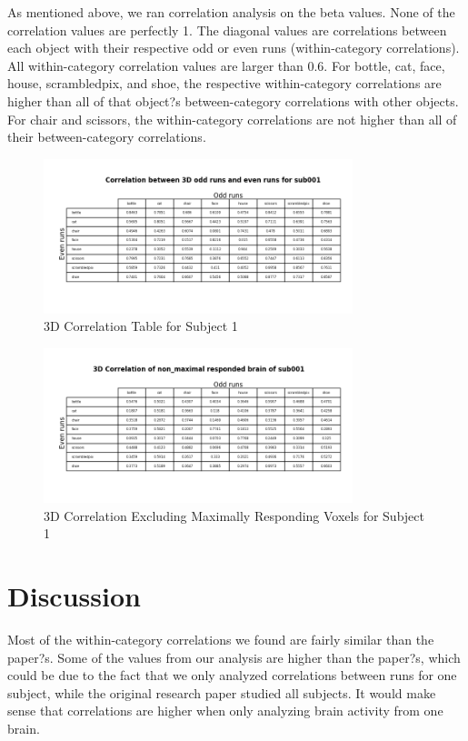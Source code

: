 \documentclass[11pt,twocolumn]{article}
\begin{document}
As mentioned above, we ran correlation analysis on the beta values.
None of the correlation values are perfectly 1. The diagonal values 
are correlations between each object with their respective odd or 
even runs (within-category correlations). All within-category correlation 
values are larger than 0.6. For bottle, cat, face, house, scrambledpix, 
and shoe, the respective within-category correlations are higher than 
all of that object?s between-category correlations with other objects. 
For chair and scissors, the within-category correlations are not higher 
than all of their between-category correlations.
\begin{figure}[h!]
\centering
\includegraphics[width=90mm]{3d_correlation_table_sub001.png}
\caption{3D Correlation Table for Subject 1}
\end{figure}

\begin{figure}[h!]                                                              
\centering                                                                      
\includegraphics[width=90mm]{3d_non_max_correlation_table_sub001.png}                   
\caption{3D Correlation Excluding Maximally Responding Voxels for Subject 1}                                    
\end{figure}

\section{Discussion}

Most of the within-category correlations we found are fairly similar than the paper?s. 
Some of the values from our analysis are higher than the paper?s, which could be 
due to the fact that we only analyzed correlations between runs for one subject, 
while the original research paper studied all subjects. It would make sense that 
correlations are higher when only analyzing brain activity from one brain. \\
\end{document}

